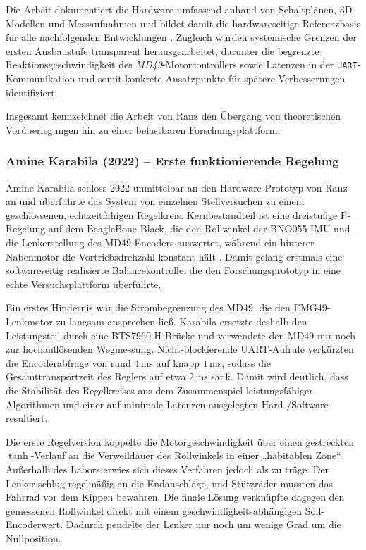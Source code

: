   Die Arbeit dokumentiert die Hardware umfassend anhand von Schaltplänen, 3D-Modellen und 
  Messaufnahmen und bildet damit die hardwareseitige Referenzbasis für alle nachfolgenden 
  Entwicklungen \citep{ranz2021bachelor}. Zugleich wurden systemische Grenzen der ersten 
  Ausbaustufe transparent herausgearbeitet, darunter die begrenzte Reaktionsgeschwindigkeit 
  des \emph{MD49}-Motorcontrollers sowie Latenzen in der \texttt{UART}-Kommunikation und somit 
  konkrete Ansatzpunkte für spätere Verbesserungen identifiziert.
  
  Insgesamt kennzeichnet die Arbeit von Ranz den Übergang von theoretischen Vorüberlegungen 
  hin zu einer belastbaren Forschungsplattform. 


  \subsubsection{Amine Karabila (2022) – Erste funktionierende Regelung}

  Amine Karabila schloss 2022 unmittelbar an den Hardware-Prototyp von Ranz an und 
  überführte das System von einzelnen Stellversuchen zu einem geschlossenen, 
  echtzeitfähigen Regelkreis. Kern­bestandteil ist eine dreistufige P-Regelung 
  auf dem BeagleBone Black, die den Rollwinkel der BNO055-IMU \citep{bno055} und 
  die Lenkerstellung des MD49-Encoders \citep{md49} auswertet, während ein hinterer 
  Nabenmotor die Vortriebsdrehzahl konstant hält \citep{karabila2022}. 
  Damit gelang erstmals eine softwareseitig realisierte Balancekontrolle, die den 
  Forschungsprototyp in eine echte Versuchsplattform überführte.
  
  Ein erstes Hindernis war die Strombegrenzung des MD49, die den EMG49-Lenkmotor 
  zu langsam ansprechen ließ. Karabila ersetzte deshalb den Leistungsteil durch eine 
  BTS7960-H-Brücke \citep{bts7960} und verwendete den MD49 nur noch zur hochauflösenden 
  Wegmessung. Nicht-blockierende UART-Aufrufe verkürzten die Encoder­abfrage von rund $4\,\mathrm{ms}$ 
  auf knapp $1\,\mathrm{ms}$, sodass die Gesamttransportzeit des Reglers auf etwa $2\,\mathrm{ms}$ sank. 
  Damit wird deutlich, dass die Stabilität des Regelkreises aus dem Zusammenspiel leistungsfähiger
  Algorithmen und einer auf minimale Latenzen ausgelegten Hard-/Software resultiert.
  
  Die erste Regel­version koppelte die Motorgeschwindigkeit über einen gestreckten $\tanh$-Verlauf an 
  die Verweildauer des Rollwinkels in einer „habitablen Zone“. Außerhalb des Labors erwies sich 
  dieses Verfahren jedoch als zu träge. Der Lenker schlug regelmäßig an die Endanschläge, und Stützräder 
  mussten das Fahrrad vor dem Kippen bewahren. Die finale Lösung verknüpfte dagegen den gemessenen 
  Rollwinkel direkt mit einem geschwindigkeits­abhängigen Soll-Encoderwert. Dadurch pendelte der 
  Lenker nur noch um wenige Grad um die Nullposition. 
  
